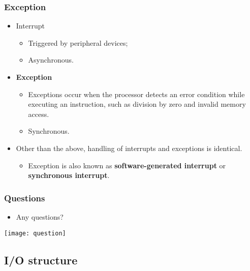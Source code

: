 \documentclass[CJKutf8,dvipsnames,table]{beamer}
\begin{document}
\begin{CJK*}{UTF8}{song}
  \begin{frame}
    \frametitle{Exception} \pause
    \begin{itemize}
    \item{Interrupt} \pause
      \begin{itemize}
      \item{Triggered by peripheral devices;} \pause
      \item{Asynchronous.} \pause
      \end{itemize}
    \item{\textbf{Exception}} \pause
      \begin{itemize}
      \item{Exceptions occur when the processor detects an error condition while executing an instruction, such as division by zero and invalid memory access.} \pause
      \item{Synchronous.} \pause
      \end{itemize}
    \item{Other than the above, handling of interrupts and exceptions is identical.} \pause
      \begin{itemize}
      \item{Exception is also known as \textbf{software-generated interrupt}
        or \textbf{synchronous interrupt}.}
      \end{itemize}
    \end{itemize}
  \end{frame}

  \begin{frame}
    \frametitle{Questions}
    \begin{itemize}
    \item{Any questions?}
    \end{itemize}
    \begin{center}
      \texttt{[image: question]}
    \end{center}
  \end{frame}

  \subsection{I/O structure}

\iffalse


\end{CJK*}
\end{document}
